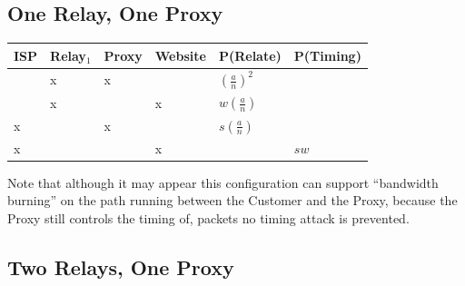 \documentclass{article}
\begin{document}

\subsection{One Relay, One Proxy}


\begin{center}
\begin{tabular}{l | l | l | l | l | l}
  ISP & Relay$_1$ & Proxy & Website & P(Relate)          & P(Timing) \\
  \hline
      & x         & x     &         & $(\frac{a}{n})^2$  & \\
  \hline
      & x         &       & x       & $w(\frac{a}{n})$   & \\
  \hline
  x   &           & x     &         & $s(\frac{a}{n})$   & \\
  \hline
  x   &           &       & x       &                    & $sw$ \\
\end{tabular}
\end{center}

Note that although it may appear this configuration can support
``bandwidth burning'' on the path running between the Customer and the
Proxy, because the Proxy still controls the timing of, packets no
timing attack is prevented.


\subsection{Two Relays, One Proxy}
\end{document}
